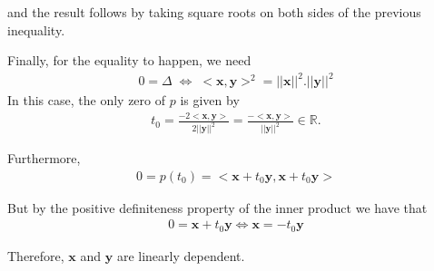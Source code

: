 \documentclass{article}
\begin{document}
and the result follows by taking square roots on both sides of the previous inequality.

Finally, for the equality to happen, we need 
\begin{align*}
    0=\Delta\; \Leftrightarrow\; <\mathbf{x},\mathbf{y}>^2 = ||\mathbf{x}||^2.||\mathbf{y}||^2
\end{align*}
In this case, the only zero of $p$ is given by
\begin{align*}
    t_0=\frac{-2<\mathbf{x},\mathbf{y}>}{2||\mathbf{y}||^2}=\frac{-<\mathbf{x},\mathbf{y}>}{||\mathbf{y}||^2} \in \mathbb{R}.
\end{align*}

Furthermore,
\begin{align*}
    0=p(t_0)=<\mathbf{x}+t_0\mathbf{y},\mathbf{x}+t_0\mathbf{y}>
\end{align*}

But by the positive definiteness property of the inner product we have that
\begin{align*}
    0=\mathbf{x}+t_0\mathbf{y}
    \Leftrightarrow
    \mathbf{x}=-t_0 \mathbf{y}
\end{align*}

Therefore, $\mathbf{x}$ and $\mathbf{y}$ are linearly dependent.
\end{document}
